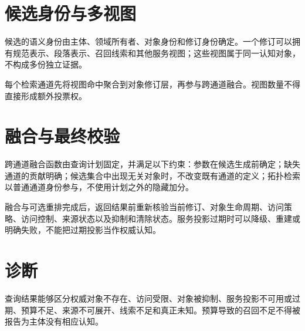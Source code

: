 \section{候选身份与多视图}

候选的语义身份由主体、领域所有者、对象身份和修订身份确定。一个修订可以拥有规范表示、段落表示、召回线索和其他服务视图；这些视图属于同一认知对象，不构成多份独立证据。

每个检索通道先将视图命中聚合到对象修订层，再参与跨通道融合。视图数量不得直接形成额外投票权。

\section{融合与最终校验}

跨通道融合函数由查询计划固定，并满足以下约束：参数在候选生成前确定；缺失通道的贡献明确；候选集合中出现无关对象时，不改变既有通道的定义；拓扑检索以普通通道身份参与，不使用计划之外的隐藏加分。

融合与可选重排完成后，返回结果前重新核验当前修订、对象生命周期、访问策略、访问控制、来源状态以及抑制和清除状态。服务投影过期时可以降级、重建或明确失败，不能把过期投影当作权威认知。

\section{诊断}

查询结果能够区分权威对象不存在、访问受限、对象被抑制、服务投影不可用或过期、预算不足、来源不可展开、线索不足和真正未知。预算导致的召回不足不得被报告为主体没有相应认知。
